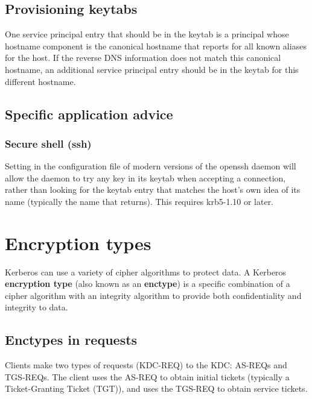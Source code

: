 \documentclass[letterpaper,10pt,english]{sphinxmanual}
\begin{document}
\section{Provisioning keytabs}
\label{admin/princ_dns:provisioning-keytabs}
One service principal entry that should be in the keytab is a
principal whose hostname component is the canonical hostname that
 reports for all known aliases for the host.  If the
reverse DNS information does not match this canonical hostname, an
additional service principal entry should be in the keytab for this
different hostname.


\section{Specific application advice}
\label{admin/princ_dns:specific-application-advice}

\subsection{Secure shell (ssh)}
\label{admin/princ_dns:secure-shell-ssh}
Setting  in the configuration file
of modern versions of the openssh daemon will allow the daemon to try
any key in its keytab when accepting a connection, rather than looking
for the keytab entry that matches the host's own idea of its name
(typically the name that  returns).  This requires
krb5-1.10 or later.


\chapter{Encryption types}
\label{admin/enctypes:enctypes}\label{admin/enctypes::doc}\label{admin/enctypes:encryption-types}
Kerberos can use a variety of cipher algorithms to protect data.  A
Kerberos \textbf{encryption type} (also known as an \textbf{enctype}) is a
specific combination of a cipher algorithm with an integrity algorithm
to provide both confidentiality and integrity to data.


\section{Enctypes in requests}
\label{admin/enctypes:enctypes-in-requests}
Clients make two types of requests (KDC-REQ) to the KDC: AS-REQs and
TGS-REQs.  The client uses the AS-REQ to obtain initial tickets
(typically a Ticket-Granting Ticket (TGT)), and uses the TGS-REQ to
obtain service tickets.
\end{document}
